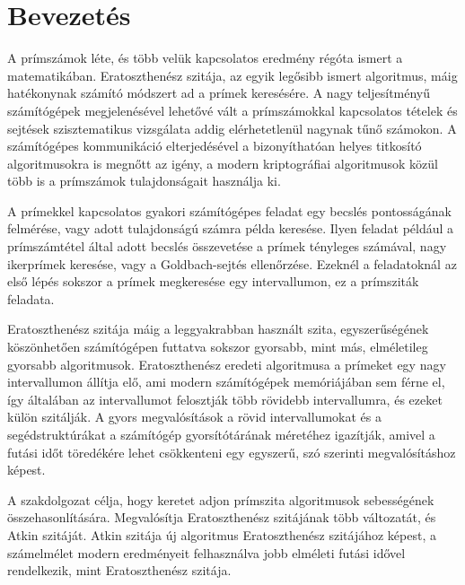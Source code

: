 \documentclass[12pt]{report}
\begin{document}
\tableofcontents

\chapter{Bevezetés}

A prímszámok léte, és több velük kapcsolatos eredmény régóta ismert a matematikában.
Eratoszthenész szitája, az egyik legősibb ismert algoritmus, máig hatékonynak számító módszert ad a prímek keresésére.
A nagy teljesítményű számítógépek megjelenésével lehetővé vált a prímszámokkal kapcsolatos tételek és sejtések szisztematikus vizsgálata addig elérhetetlenül nagynak tűnő számokon.
A számítógépes kommunikáció elterjedésével a bizonyíthatóan helyes titkosító algoritmusokra is megnőtt az igény, a modern kriptográfiai algoritmusok közül több is a prímszámok tulajdonságait használja ki.

A prímekkel kapcsolatos gyakori számítógépes feladat egy becslés pontosságának felmérése, vagy adott tulajdonságú számra példa keresése.
Ilyen feladat például a prímszámtétel által adott becslés összevetése a prímek tényleges számával, nagy ikerprímek keresése\cite{twinprimes}, vagy a Goldbach-sejtés ellenőrzése\cite{gaps}.
Ezeknél a feladatoknál az első lépés sokszor a prímek megkeresése egy intervallumon, ez a prímsziták feladata.

Eratoszthenész szitája máig a leggyakrabban használt szita, egyszerűségének köszönhetően számítógépen futtatva sokszor gyorsabb, mint más, elméletileg gyorsabb algoritmusok.
Eratoszthenész eredeti algoritmusa a prímeket egy nagy intervallumon állítja elő, ami modern számítógépek memóriájában sem férne el, így általában az intervallumot felosztják több rövidebb intervallumra, és ezeket külön szitálják.
A gyors megvalósítások a rövid intervallumokat és a segédstruktúrákat a számítógép gyorsítótárának méretéhez igazítják, amivel a futási időt töredékére lehet csökkenteni egy egyszerű, szó szerinti megvalósításhoz képest.

A szakdolgozat célja, hogy keretet adjon prímszita algoritmusok sebességének összehasonlítására.
Megvalósítja Eratoszthenész szitájának több változatát, és Atkin szitáját\cite{atkin}.
Atkin szitája új algoritmus Eratoszthenész szitájához képest, a számelmélet modern eredményeit felhasználva jobb elméleti futási idővel rendelkezik, mint Eratoszthenész szitája.






\end{document}
